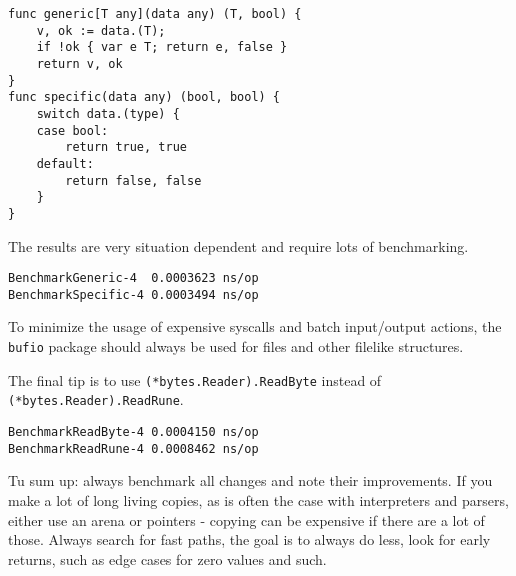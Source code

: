     \begin{verbatim}
func generic[T any](data any) (T, bool) {
    v, ok := data.(T);
    if !ok { var e T; return e, false }
    return v, ok
}
func specific(data any) (bool, bool) {
    switch data.(type) {
    case bool:
        return true, true
    default:
        return false, false
    }
}
    \end{verbatim}

    The results are very situation dependent and require lots of benchmarking.

    \begin{verbatim}
BenchmarkGeneric-4  0.0003623 ns/op
BenchmarkSpecific-4 0.0003494 ns/op
    \end{verbatim}

    To minimize the usage of expensive syscalls and batch input/output actions,
    the \texttt{bufio} package should always be used for files and other
    filelike structures.

    The final tip is to use \texttt{(*bytes.Reader).ReadByte} instead of
    \texttt{(*bytes.Reader).ReadRune}.

    \begin{verbatim}
BenchmarkReadByte-4 0.0004150 ns/op
BenchmarkReadRune-4 0.0008462 ns/op
    \end{verbatim}

    Tu sum up: always benchmark all changes and note their improvements. If you
    make a lot of long living copies, as is often the case with interpreters
    and parsers, either use an arena or pointers - copying can be expensive if
    there are a lot of those. Always search for fast paths, the goal is to
    always do less, look for early returns, such as edge cases for zero values
    and such.


